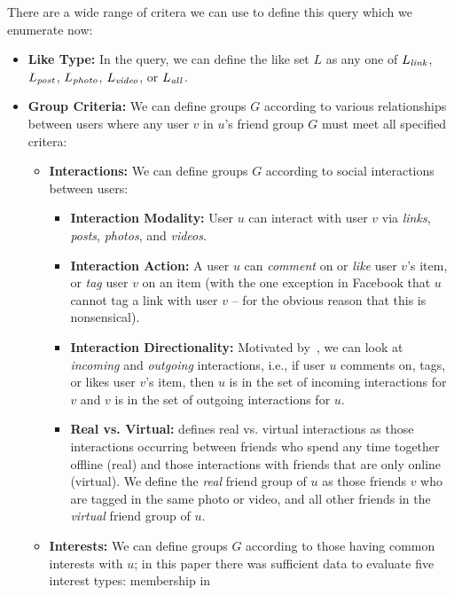 There are a wide range of critera we can use to define this
query which we enumerate now:
\begin{itemize}
\item \textbf{Like Type:} In the query, we can define the like
set $L$ as any one of $L_{\mathit{link}}$, $L_{\mathit{post}}$, $L_{\mathit{photo}}$, $L_{\mathit{video}}$,
or $L_{\mathit{all}}$.
\item \textbf{Group Criteria:}  We can define 
    groups $G$ according to various relationships between users where
    any user $v$ in $u$'s friend group $G$ must meet all specified
    critera:
  \begin{itemize}
    \item \textbf{Interactions:} We can define 
    groups $G$ according to social interactions between users:
      \begin{itemize}
      \item \textbf{Interaction Modality:} User $u$ can interact with
       user $v$ via \textit{links}, \textit{posts}, 
       \textit{photos}, and \textit{videos}.
      \item \textbf{Interaction Action:} A user $u$ can
      \textit{comment} on or \textit{like} user $v$'s item,
      or \textit{tag} user $v$ on an item 
      (with the one exception in Facebook that $u$ cannot tag
      a link with user $v$ -- for the obvious reason that this is
      nonsensical).
      \item \textbf{Interaction Directionality:} Motivated
      by~\cite{saez2011high}, we can look
      at \textit{incoming} and \textit{outgoing} interactions, i.e.,
      if user $u$ comments on, tags, or likes user $v$'s item,
      then $u$ is in the set of incoming interactions for $v$
      and $v$ is in the set of outgoing interactions for $u$.
      \item \textbf{Real vs. Virtual:} \cite{brandtzag2011facebook}
      defines real vs. virtual interactions as those interactions
      occurring between friends who spend any time together offline
      (real) and those interactions with friends that are only online
      (virtual).  We define the \textit{real} friend group of $u$ as
      those friends $v$ who are tagged in the same photo or
      video, and all other friends in the \textit{virtual} friend group
      of $u$.
    \end{itemize}
    \item \textbf{Interests:} We can define groups $G$ according to
      those having common interests with $u$; in this paper there was
      sufficient data to evaluate five interest types: membership in

\end{itemize}
\end{itemize}
